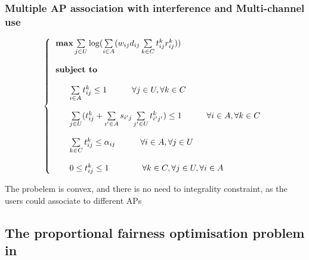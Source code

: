 \documentclass[journal,transmag]{IEEEtran}
\begin{document}
\subsubsection{Multiple AP association with interference and Multi-channel use} 
\begin{footnotesize}
\begin{equation}
\left\{
\begin{tabular}{l}
$\textbf{max}  \sum\limits_{j \in U} \log ( \sum\limits_{i \in A}(w_{ij} d_{ij} \sum\limits_{k \in C} t_{ij}^k r_{ij}^k)) $ \\         
\\
\textbf{subject to} \\
\\
~~~~~$ \sum\limits_{i \in A} t_{ij}^k \leq 1 ~~~~~~~~~ \forall j \in U, \forall k \in C  $ \\ 

\\
~~~~~$ \sum\limits_{j \in U} (t_{ij}^k + \sum\limits_{i' \in A} s_{i'j} \sum\limits_{j' \in U} t_{i'j'}^k) \leq 1 ~~~~~~~~~ \forall i \in A, \forall k \in C   $ \\

\\
~~~~~$ \sum\limits_{k \in C} t_{ij}^k \leq \alpha_{ij} ~~~~~~~~~ \forall i \in A, \forall j \in U  $ \\ 

\\
~~~~~$ 0\leq t_{ij}^k \leq 1   ~~~~~~~~~~~~ \forall k \in C, \forall j \in U, \forall i \in A  $ \\

\end{tabular}
\right.
\end{equation}
\end{footnotesize}
The probelem is convex, and there is no need to integrality constraint, as the users could associate to different APs

\subsection{The proportional fairness optimisation problem in \cite{08proportional_fairness_multiRate_LAN}}
\end{document}

